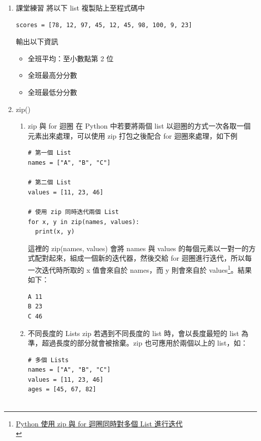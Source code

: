 \documentclass[a4paper,12pt]{article}
\begin{document}
\begin{enumerate}
\begin{verbatim}
4
2
['T', 'N', 'F', 'S', 'H']
[]
[35]
[35, 89, 'James', 100]
[35, 89, 100]
[35, 200, 89, 100]
[89, 200, 35]
324
[35, 89, 200]
a-b-c
\end{verbatim}

\item 課堂練習
\label{sec:orgcd0be9d}
將以下 list 複製貼上至程式碼中\\
\lstset{breaklines=true,language=Python,label= ,caption= ,captionpos=b,firstnumber=1,numbers=left}
\begin{lstlisting}
scores = [78, 12, 97, 45, 12, 45, 98, 100, 9, 23]
\end{lstlisting}
輸出以下資訊\\
\begin{itemize}
\item 全班平均：至小數點第 2 位\\
\item 全班最高分分數\\
\item 全班最低分分數\\
\end{itemize}

\item zip()
\label{sec:orgdc0e6ec}
\begin{enumerate}
\item zip 與 for 迴圈
\label{sec:org9e924bb}
在 Python 中若要將兩個 list 以迴圈的方式一次各取一個元素出來處理，可以使用 zip 打包之後配合 for 迴圈來處理，如下例\\
\lstset{breaklines=true,language=Python,label= ,caption= ,captionpos=b,firstnumber=1,numbers=left}
\begin{lstlisting}
# 第一個 List
names = ["A", "B", "C"]

# 第二個 List
values = [11, 23, 46]

# 使用 zip 同時迭代兩個 List
for x, y in zip(names, values):
  print(x, y)
\end{lstlisting}
這裡的 zip(names, values) 會將 names 與 values 的每個元素以一對一的方式配對起來，組成一個新的迭代器，然後交給 for 迴圈進行迭代，所以每一次迭代時所取的 x 值會來自於 names，而 y 則會來自於 values\footnote{\href{https://blog.gtwang.org/programming/python-iterate-through-multiple-lists-in-parallel/}{Python 使用 zip 與 for 迴圈同時對多個 List 進行迭代}\\}。結果如下：\\
\begin{verbatim}
A 11
B 23
C 46
\end{verbatim}
\item 不同長度的 Lists
\label{sec:orgca77d76}
zip 若遇到不同長度的 list 時，會以長度最短的 list 為準，超過長度的部分就會被捨棄。zip 也可應用於兩個以上的 list，如：\\
\lstset{breaklines=true,language=Python,label= ,caption= ,captionpos=b,firstnumber=1,numbers=left}
\begin{lstlisting}
# 多個 Lists
names = ["A", "B", "C"]
values = [11, 23, 46]
ages = [45, 67, 82]


\end{lstlisting}
\end{enumerate}
\end{enumerate}
\end{document}
